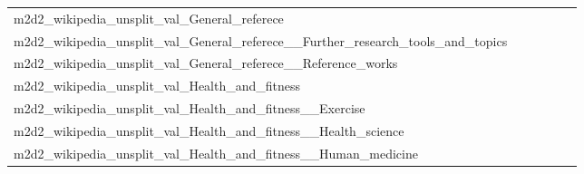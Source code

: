 {\begin{longtable}{m{6cm}m{1.7cm}m{1.7cm}m{1.7cm}m{1.7cm}m{1.7cm}}
	m2d2\_wikipedia\_unsplit\_val\_General\_referece  & \colorbox[HTML]{fdfedb}{\makebox[\mywidth][c]{11.80}} & \colorbox[HTML]{ddf1a6}{\makebox[\mywidth][c]{11.46}} & \colorbox[HTML]{ffffe5}{\makebox[\mywidth][c]{12.43}} & \colorbox[HTML]{dcf1a5}{\makebox[\mywidth][c]{11.46}} & \colorbox[HTML]{77c578}{\makebox[\mywidth][c]{11.30}}\\
	m2d2\_wikipedia\_unsplit\_val\_General\_referece\_\_Further\_research\_tools\_and\_topics  & \colorbox[HTML]{fefee2}{\makebox[\mywidth][c]{10.52}} & \colorbox[HTML]{f3fab6}{\makebox[\mywidth][c]{10.20}} & \colorbox[HTML]{ffffe5}{\makebox[\mywidth][c]{10.96}} & \colorbox[HTML]{d9f0a3}{\makebox[\mywidth][c]{10.12}} & \colorbox[HTML]{77c578}{\makebox[\mywidth][c]{9.99}}\\
	m2d2\_wikipedia\_unsplit\_val\_General\_referece\_\_Reference\_works  & \colorbox[HTML]{fdfedb}{\makebox[\mywidth][c]{11.80}} & \colorbox[HTML]{ddf1a6}{\makebox[\mywidth][c]{11.46}} & \colorbox[HTML]{ffffe5}{\makebox[\mywidth][c]{12.43}} & \colorbox[HTML]{dcf1a5}{\makebox[\mywidth][c]{11.46}} & \colorbox[HTML]{77c578}{\makebox[\mywidth][c]{11.30}}\\
	m2d2\_wikipedia\_unsplit\_val\_Health\_and\_fitness  & \colorbox[HTML]{fefee2}{\makebox[\mywidth][c]{10.75}} & \colorbox[HTML]{edf8b2}{\makebox[\mywidth][c]{10.47}} & \colorbox[HTML]{ffffe5}{\makebox[\mywidth][c]{11.14}} & \colorbox[HTML]{bde395}{\makebox[\mywidth][c]{10.37}} & \colorbox[HTML]{77c578}{\makebox[\mywidth][c]{10.30}}\\
	m2d2\_wikipedia\_unsplit\_val\_Health\_and\_fitness\_\_Exercise  & \colorbox[HTML]{fefee3}{\makebox[\mywidth][c]{9.64}} & \colorbox[HTML]{e5f5ac}{\makebox[\mywidth][c]{9.29}} & \colorbox[HTML]{ffffe5}{\makebox[\mywidth][c]{9.95}} & \colorbox[HTML]{ddf1a6}{\makebox[\mywidth][c]{9.27}} & \colorbox[HTML]{77c578}{\makebox[\mywidth][c]{9.16}}\\
	m2d2\_wikipedia\_unsplit\_val\_Health\_and\_fitness\_\_Health\_science  & \colorbox[HTML]{ffffe5}{\makebox[\mywidth][c]{10.10}} & \colorbox[HTML]{f8fcc2}{\makebox[\mywidth][c]{9.80}} & \colorbox[HTML]{ffffe5}{\makebox[\mywidth][c]{10.43}} & \colorbox[HTML]{e6f5ad}{\makebox[\mywidth][c]{9.71}} & \colorbox[HTML]{77c578}{\makebox[\mywidth][c]{9.56}}\\
	m2d2\_wikipedia\_unsplit\_val\_Health\_and\_fitness\_\_Human\_medicine  & \colorbox[HTML]{fefee3}{\makebox[\mywidth][c]{9.14}} & \colorbox[HTML]{f8fcc1}{\makebox[\mywidth][c]{8.83}} & \colorbox[HTML]{ffffe5}{\makebox[\mywidth][c]{9.59}} & \colorbox[HTML]{bee496}{\makebox[\mywidth][c]{8.63}} & \colorbox[HTML]{77c578}{\makebox[\mywidth][c]{8.54}}\\

\end{longtable}}
